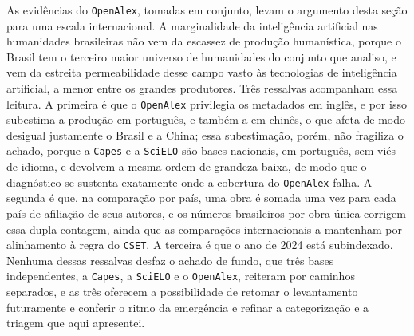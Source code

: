 As evidências do \texttt{OpenAlex}, tomadas em conjunto, levam o argumento desta seção para uma escala internacional. A marginalidade da inteligência artificial nas humanidades brasileiras não vem da escassez de produção humanística, porque o Brasil tem o terceiro maior universo de humanidades do conjunto que analiso, e vem da estreita permeabilidade desse campo vasto às tecnologias de inteligência artificial, a menor entre os grandes produtores. Três ressalvas acompanham essa leitura. A primeira é que o \texttt{OpenAlex} privilegia os metadados em inglês, e por isso subestima a produção em português, e também a em chinês, o que afeta de modo desigual justamente o Brasil e a China; essa subestimação, porém, não fragiliza o achado, porque a \texttt{Capes} e a \texttt{SciELO} são bases nacionais, em português, sem viés de idioma, e devolvem a mesma ordem de grandeza baixa, de modo que o diagnóstico se sustenta exatamente onde a cobertura do \texttt{OpenAlex} falha. A segunda é que, na comparação por país, uma obra é somada uma vez para cada país de afiliação de seus autores, e os números brasileiros por obra única corrigem essa dupla contagem, ainda que as comparações internacionais a mantenham por alinhamento à regra do \texttt{CSET}. A terceira é que o ano de 2024 está subindexado. Nenhuma dessas ressalvas desfaz o achado de fundo, que três bases independentes, a \texttt{Capes}, a \texttt{SciELO} e o \texttt{OpenAlex}, reiteram por caminhos separados, e as três oferecem a possibilidade de retomar o levantamento futuramente e conferir o ritmo da emergência e refinar a categorização e a triagem que aqui apresentei.

